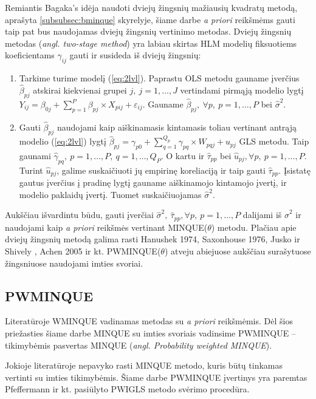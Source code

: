 \documentclass[11pt,a4paper]{article}
\begin{document}
\indent Remiantis Bagaka's idėja naudoti dviejų žingsnių mažiausių kvadratų metodą, aprašyta \ref{subsubsec:bminque} skyrelyje, šiame darbe \textit{a priori} reikšmėms gauti taip pat bus naudojamas dviejų žingsnių vertinimo metodas. Dviejų žingsnių metodas (\textit{angl. two-stage method}) yra labiau skirtas HLM modelių fiksuotiems koeficientams $\gamma_{ij}$ gauti ir susideda iš dviejų žingsnių:
\begin{enumerate}
\item Tarkime turime modelį (\ref{eq:2lvl}). Paprastu OLS metodu gauname įverčius $\hat{\beta}_{pj}$ atskirai kiekvienai grupei $j,\ j=1,\dots,J$ vertindami pirmąją modelio lygtį $Y_{ij} = \beta_{0j}+\sum^P_{p = 1} \beta_{pj}\times X_{pij}+\varepsilon_{ij}$. Gauname $\hat{\beta}_{pj}, \ \forall p,\ p=1,\dots,P$ bei $\hat{\sigma}^2$.
\item Gauti $\hat{\beta}_{pj}$ naudojami kaip aiškinamasis kintamasis toliau vertinant antrąją modelio (\ref{eq:2lvl}) lygtį $\hat{\beta}_{pj} = \gamma_{p0} + \sum^{Q_p}_{q=1}\gamma_{pq}\times W_{pqj}+u_{pj}$ GLS metodu. Taip gaunami $\hat{\gamma}_{pq}, \ p=1,\dots,P,\  q=1,\dots,Q_P$. O kartu ir $\hat{\tau}_{pp}$ bei $\hat{u}_{pj}, \forall p,\ p=1,\dots,P$. Turint $\hat{u}_{pj}$, galime suskaičiuoti jų empirinę koreliaciją ir taip gauti $\hat{\tau}_{pp}$. Įsistatę gautus įverčius į pradinę lygtį gauname aiškinamojo kintamojo įvertį, ir modelio paklaidų įvertį. Tuomet suskaičiuojamas $\hat{\sigma}^2$.
\end{enumerate}

\indent Aukščiau išvardintu būdu, gauti įverčiai $\hat{\sigma}^2,\ \hat{\tau}_{pp}, \forall p,\ p=1,\dots,P$ dalijami iš $\hat{\sigma}^2$ ir naudojami kaip \textit{a priori} reikšmės vertinant MINQUE($\theta$) metodu. Plačiau apie dviejų žingsnių metodą galima rasti Hanushek 1974\cite{hanushek}, Saxonhouse 1976\cite{saxonhouse}, Jusko ir Shively \cite{jusko},  Achen 2005\cite{achen} ir kt. PWMINQUE($\theta$) atveju abiejuose aukščiau surašytuose žingsniuose naudojami imties svoriai.


\subsection{PWMINQUE}
\indent Literatūroje WMINQUE vadinamas metodas su \textit{a priori} reikšmėmis. Dėl šios priežasties šiame darbe MINQUE su imties svoriais vadinsime PWMINQUE -- tikimybėmis pasvertas MINQUE (\textit{angl. Probability weighted MINQUE}).

\indent Jokioje literatūroje nepavyko rasti MINQUE metodo, kuris būtų tinkamas vertinti su imties tikimybėmis. Šiame darbe PWMINQUE įvertinys yra paremtas Pfeffermann ir kt.\cite{pfeff} pasiūlyto PWIGLS metodo svėrimo procedūra.
\end{document}
